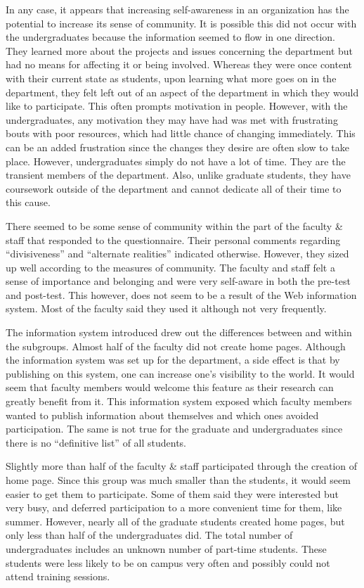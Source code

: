 In any case, it appears that increasing self-awareness in an organization has
the potential to increase its sense of community.  It is possible this did not
occur with the undergraduates because the information seemed to flow in one
direction.  They learned more about the projects and issues concerning the
department but had no means for affecting it or being involved.  Whereas they
were once content with their current state as students, upon learning what more
goes on in the department, they felt left out of an aspect of the department in
which they would like to participate.  This often prompts motivation in people.
However, with the undergraduates, any motivation they may have had was met with
frustrating bouts with poor resources, which had little chance of changing
immediately.  This can be an added frustration since the changes they desire
are often slow to take place.  However, undergraduates simply do not have a lot
of time.  They are the transient members of the department.  Also, unlike
graduate students, they have coursework outside of the department and cannot
dedicate all of their time to this cause.

There seemed to be some sense of community within the part of the faculty \&
staff that responded to the questionnaire.  Their personal comments regarding
``divisiveness'' and ``alternate realities'' indicated otherwise.  However,
they sized up well according to the measures of community.  The faculty and
staff felt a sense of importance and belonging and were very self-aware in both
the pre-test and post-test.  This however, does not seem to be a result of the
Web information system.  Most of the faculty said they used it although not
very frequently.

The information system introduced drew out the differences between and within
the subgroups.  Almost half of the faculty did not create home pages.  Although
the information system was set up for the department, a side effect is that by
publishing on this system, one can increase one's visibility to the world.  It
would seem that faculty members would welcome this feature as their research
can greatly benefit from it.  This information system exposed which faculty
members wanted to publish information about themselves and which ones avoided
participation.  The same is not true for the graduate and undergraduates since
there is no ``definitive list'' of all students.

Slightly more than half of the faculty \& staff participated through the
creation of home page.  Since this group was much smaller than the students, it
would seem easier to get them to participate.  Some of them said they were
interested but very busy, and deferred participation to a more convenient time
for them, like summer.  However, nearly all of the graduate students created
home pages, but only less than half of the undergraduates did.  The total
number of undergraduates includes an unknown number of part-time students.
These students were less likely to be on campus very often and possibly could
not attend training sessions.

